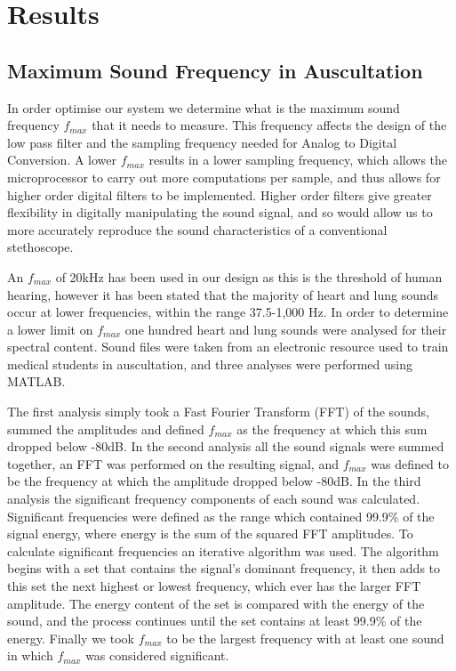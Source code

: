 \chapter{Results} \label{results}


\section{Maximum Sound Frequency in Auscultation} \label{max-sound-freq}
In order optimise our system we determine what is the maximum sound frequency $f_{max}$ that it needs to measure. This frequency affects the design of the low pass filter and the sampling frequency needed for Analog to Digital Conversion. A lower $f_{max}$ results in a lower sampling frequency, which allows the microprocessor to carry out more computations per sample, and thus allows for higher order digital filters to be implemented. Higher order filters give greater flexibility in digitally manipulating the sound signal, and so would allow us to more accurately reproduce the sound characteristics of a conventional stethoscope.

An $f_{max}$ of 20kHz has been used in our design as this is the threshold of human hearing\cite[p.~163]{Stuart2011}, however it has been stated that the majority of heart and lung sounds occur at lower frequencies, within the range 37.5-1,000 Hz\cite{Abella1992}. In order to determine a lower limit on $f_{max}$ one hundred heart and lung sounds were analysed for their spectral content. Sound files were taken from an electronic resource used to train medical students in auscultation\cite{Coviello2014}, and three analyses were performed using MATLAB. 

The first analysis simply took a Fast Fourier Transform (FFT) of the sounds, summed the amplitudes and defined $f_{max}$ as the frequency at which this sum dropped below -80dB. In the second analysis all the sound signals were summed together, an FFT was performed on the resulting signal, and $f_{max}$ was defined to be the frequency at which the amplitude dropped below -80dB. In the third analysis the significant frequency components of each sound was calculated. Significant frequencies were defined as the range which contained 99.9\% of the signal energy, where energy is the sum of the squared FFT amplitudes. To calculate significant frequencies an iterative algorithm was used. The algorithm begins with a set that contains the signal's dominant frequency, it then adds to this set the next highest or lowest frequency, which ever has the larger FFT amplitude. The energy content of the set is compared with the energy of the sound, and the process continues until the set contains at least 99.9\% of the energy. Finally we took $f_{max}$ to be the largest frequency with at least one sound in which $f_{max}$ was considered significant. 

